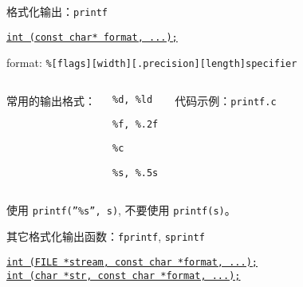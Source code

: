 \begin{frame}{格式化输出：\texttt{printf}}
  \centerline{\href{http://www.cplusplus.com/reference/cstdio/printf/}{\texttt{int (const char* format, ...);}}}

  \vspace{0.50cm}
  \centerline{format: \texttt{\%[flags][width][.precision][length]specifier}}

  \vspace{0.60cm}
  \pause
  \begin{columns}
      常用的输出格式：
      \begin{description}
	\item[Decimal integer] \texttt{\%d, \%ld}
	\item[Decimal float] \texttt{\%f, \%.2f}
	\item[Character] \texttt{\%c}
	\item[String] \texttt{\%s, \%.5s}
      \end{description}
      \centerline{代码示例：\texttt{printf.c}}
  \end{columns}

  \vspace{0.30cm}
  \centerline{使用 \texttt{printf(''\%s'', s)}, 不要使用 \texttt{printf(s)}。}
\end{frame}

\begin{frame}{其它格式化输出函数：\texttt{fprintf}, \texttt{sprintf}}
  \begin{center}
    \href{http://www.cplusplus.com/reference/cstdio/fprintf/}
    {\texttt{int (FILE *stream, const char *format, ...);}} \\[0.50cm]

    \href{http://www.cplusplus.com/reference/cstdio/sprintf/}
    {\texttt{int (char *str, const char *format, ...);}}
  \end{center}
\end{frame}

